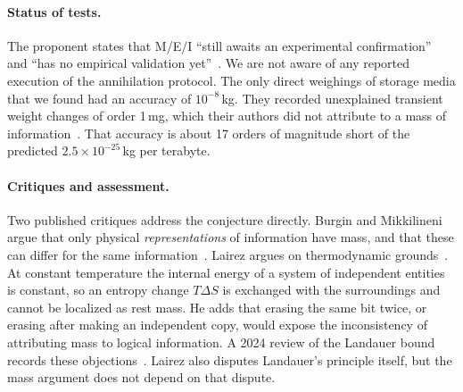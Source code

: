 \paragraph{Status of tests.}
The proponent states that M/E/I ``still awaits an experimental confirmation''~\cite{Vopson2022second}
and ``has no empirical validation yet''~\cite{Vopson2025response}. We are not aware of any reported
execution of the annihilation protocol. The only direct weighings of storage media that we found
had an accuracy of $10^{-8}$\,kg. They recorded unexplained transient weight changes of order
1\,mg, which their authors did not attribute to a mass of information~\cite{Kish2013does,Kish2007gravitational}. That
accuracy is about 17 orders of magnitude short of the predicted $2.5\times10^{-25}$\,kg per
terabyte.

\paragraph{Critiques and assessment.}
Two published critiques address the conjecture directly. Burgin and Mikkilineni argue that only
physical \emph{representations} of information have mass, and that these can differ for the same
information~\cite{Burgin2022is}. Lairez argues on thermodynamic grounds~\cite{Lairez2024on}. At
constant temperature the internal energy of a system of independent entities is constant, so an
entropy change $T\Delta S$ is exchanged with the surroundings and cannot be localized as rest mass.
He adds that erasing the same bit twice, or erasing after making an independent copy, would expose
the inconsistency of attributing mass to logical information. A 2024 review of the Landauer bound
records these objections~\cite{Bormashenko2024landauer}. Lairez also disputes Landauer's principle
itself, but the mass argument does not depend on that dispute.

